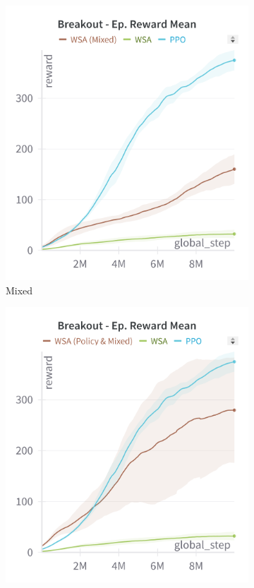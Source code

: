 \begin{figure}[ht]
\begin{subfigure}[b]{0.32\textwidth}
        \includegraphics[width=\textwidth]{images/breakout_expert}
        \caption{Mixed}
        \label{fig:breakout_expert}
    \end{subfigure}
    \hfill
    \begin{subfigure}[b]{0.32\textwidth}
        \centering
        \includegraphics[width=\textwidth]{images/breakout_policy_mixed}

\end{subfigure}
\end{figure}

